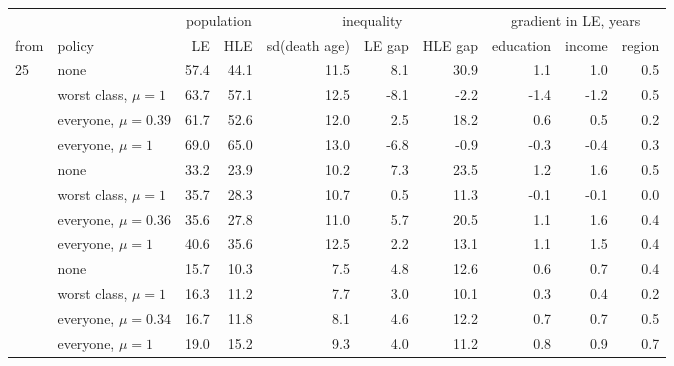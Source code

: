 \begin{tabular}{llrrrrrrrr}
\toprule
 & & \multicolumn{2}{c}{population} & \multicolumn{3}{c}{inequality} & \multicolumn{3}{c}{gradient in LE, years} \\
\cmidrule(lr){3-4} \cmidrule(lr){5-7} \cmidrule(lr){8-10}
from & policy & LE & HLE & sd(death age) & LE gap & HLE gap & education & income & region \\
\midrule
25 & none & 57.4 & 44.1 & 11.5 & 8.1 & 30.9 & 1.1 & 1.0 & 0.5 \\
 & worst class, $\mu=1$ & 63.7 & 57.1 & 12.5 & -8.1 & -2.2 & -1.4 & -1.2 & 0.5 \\
 & everyone, $\mu=0.39$ & 61.7 & 52.6 & 12.0 & 2.5 & 18.2 & 0.6 & 0.5 & 0.2 \\
 & everyone, $\mu=1$ & 69.0 & 65.0 & 13.0 & -6.8 & -0.9 & -0.3 & -0.4 & 0.3 \\
\addlinespace
50 & none & 33.2 & 23.9 & 10.2 & 7.3 & 23.5 & 1.2 & 1.6 & 0.5 \\
 & worst class, $\mu=1$ & 35.7 & 28.3 & 10.7 & 0.5 & 11.3 & -0.1 & -0.1 & 0.0 \\
 & everyone, $\mu=0.36$ & 35.6 & 27.8 & 11.0 & 5.7 & 20.5 & 1.1 & 1.6 & 0.4 \\
 & everyone, $\mu=1$ & 40.6 & 35.6 & 12.5 & 2.2 & 13.1 & 1.1 & 1.5 & 0.4 \\
\addlinespace
70 & none & 15.7 & 10.3 & 7.5 & 4.8 & 12.6 & 0.6 & 0.7 & 0.4 \\
 & worst class, $\mu=1$ & 16.3 & 11.2 & 7.7 & 3.0 & 10.1 & 0.3 & 0.4 & 0.2 \\
 & everyone, $\mu=0.34$ & 16.7 & 11.8 & 8.1 & 4.6 & 12.2 & 0.7 & 0.7 & 0.5 \\
 & everyone, $\mu=1$ & 19.0 & 15.2 & 9.3 & 4.0 & 11.2 & 0.8 & 0.9 & 0.7 \\
\bottomrule
\end{tabular}

